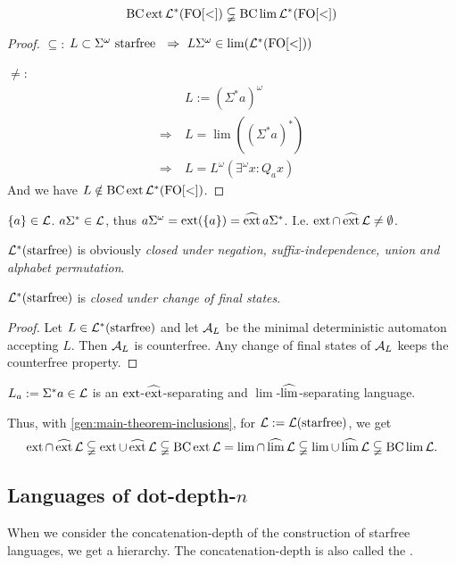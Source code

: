 \begin{theorem}
\[ \operatorname{BC} \operatorname{ext} \mathcal{L}^*( \mathrm{FO[<]} ) \subsetneqq \operatorname{BC} \lim \mathcal{L}^* ( \mathrm{FO[<]} ) \]
\begin{proof}
$\subseteq$: $L \subset \Sigma^\omega \text{ starfree } \ \Rightarrow\ L \Sigma^\omega \in \lim( \Lang^*( \mathrm{FO[<]} ) )$

$\neq$:
\begin{align*}
& L := (\Sigma^* a)^\omega \\
\Rightarrow \ & L = \lim( (\Sigma^* a)^* ) \\
\Rightarrow \ & L = L^\omega(\exists^\omega x : Q_a x)
\end{align*}
And we have $L \notin \operatorname{BC} \operatorname{ext} \mathcal{L}^* (\mathrm{FO[<]})$.
\end{proof}
\end{theorem}

$\Set{a} \in \Lang$. $a \Sigma^* \in \mathcal{L}$, thus $a\Sigma^\omega = \ext(\Set{a}) = \dext{a\Sigma^*}$. I.e. $\operatorname{ext} \cap \operatorname{\widehat{ext}} \mathcal{L} \ne \emptyset$.

$\mathcal{L}^*(\textup{\textrm{starfree}})$ is obviously \emph{closed under negation, suffix-independence, union and alphabet permutation}.

\begin{lemma}
\label{lang:starfree:closurefinalstates}
$\mathcal{L}^*(\textup{\textrm{starfree}})$ is \emph{closed under change of final states}.
\begin{proof}
Let $L \in \mathcal{L}^*(\textup{\textrm{starfree}})$ and let $\mathcal{A}_L$ be the minimal deterministic automaton accepting $L$. Then $\mathcal{A}_L$ is counterfree. Any change of final states of $\mathcal{A}_L$ keeps the counterfree property.
\end{proof}
\end{lemma}

$L_a := \Sigma^* a \in \mathcal{L}$ is an $\operatorname{ext}$-$\operatorname{\widehat{ext}}$-separating and $\lim$-$\operatorname{\widehat{lim}}$-separating language.

Thus, with \cref{gen:main-theorem-inclusions}, for $\mathcal{L} := \mathcal{L}(\textup{\textrm{starfree}})$, we get
\[ \operatorname{ext} \cap \operatorname{\widehat{ext}} \mathcal{L} \subsetneqq
\operatorname{ext} \cup \operatorname{\widehat{ext}} \mathcal{L} \subsetneqq
\operatorname{BC} \operatorname{ext} \mathcal{L} =
\lim \cap \operatorname{\widehat{lim}} \mathcal{L} \subsetneqq
\lim \cup \operatorname{\widehat{lim}} \mathcal{L} \subsetneqq
\operatorname{BC} \lim \mathcal{L} . \]


\subsection{Languages of dot-depth-$n$}
\label{lang:dotdepth}
When we consider the concatenation-depth of the construction of starfree languages, we get a hierarchy. The concatenation-depth is also called the .

